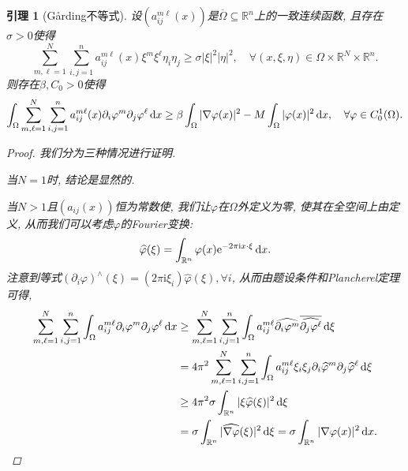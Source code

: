 \documentclass[12pt,a4paper]{article}
\newtheorem{lemma}[theorem]{引理}
\begin{document}
\begin{lemma}[G\r arding不等式]
    设$(a_{ij}^{m\ell}(x))$是$\overline{\Omega} \subseteq \mathbb{R}^n$上的一致连续函数, 且存在$\sigma > 0$使得 
    \begin{equation*}
        \sum_{m, \ell = 1}^N\sum_{i, j = 1}^na_{ij}^{m\ell}(x)\xi^m\xi^\ell\eta_i\eta_j \geq \sigma|\xi|^2|\eta|^2, \quad \forall (x, \xi, \eta) \in \Omega \times \mathbb{R}^N \times \mathbb{R}^n.
    \end{equation*}
    则存在$\beta, C_0 > 0$使得 
    \begin{equation*}
        \int_{\Omega}\sum_{m, \ell = 1}^N\sum_{i, j = 1}^na_{ij}^{m\ell}(x)\partial_i\varphi^m\partial_j\varphi^\ell \,{\rm d}x \geq \beta\int_{\Omega}|\nabla\varphi(x)|^2 - M\int_{\Omega}|\varphi(x)|^2 \,{\rm d}x, \quad \forall \varphi \in C_0^1(\Omega).
    \end{equation*}
    \begin{proof}
        我们分为三种情况进行证明. 

        当$N = 1$时, 结论是显然的.

        当$N > 1$且$(a_{ij}(x))$恒为常数使, 我们让$\varphi$在$\Omega$外定义为零, 使其在全空间上由定义, 从而我们可以考虑$\varphi$的Fourier变换:
        \begin{equation*}
            \widehat{\varphi}(\xi) = \int_{\mathbb{R}^n}\varphi(x)\mathrm{e}^{-2\pi\mathrm{i}x \cdot \xi} \,{\rm d}x. 
        \end{equation*}
        注意到等式$(\partial_i\varphi)^{\wedge}(\xi) = (2\pi\mathrm{i}\xi_i)\widehat{\varphi}(\xi), \forall i$, 从而由题设条件和Plancherel定理可得, 
        \begin{align*}
            \sum_{m, \ell = 1}^N\sum_{i, j = 1}^n\int_{\Omega}a_{ij}^{m\ell}\partial_i\varphi^m\partial_j\varphi^\ell \,{\rm d}x &\geq \sum_{m, \ell = 1}^N\sum_{i, j = 1}^n\int_{\Omega}a_{ij}^{m\ell}\widehat{\partial_i\varphi^m}\overline{\widehat{\partial_j\varphi^\ell}} \,{\rm d}\xi \\ 
            &= 4\pi^2 \sum_{m, \ell = 1}^N\sum_{i, j = 1}^n\int_{\Omega}a_{ij}^{m\ell}\xi_i\xi_j\partial_i\widehat{\varphi}^m\partial_j\widehat{\varphi}^\ell \,{\rm d}\xi \\ 
            &\geq 4\pi^2\sigma\int_{\mathbb{R}^n}|\xi\widehat{\varphi}(\xi)|^2 \,{\rm d}\xi \\  
            &= \sigma\int_{\mathbb{R}^n}|\widehat{\nabla\varphi}(\xi)|^2 \,{\rm d}\xi = \sigma\int_{\mathbb{R}^n}|\nabla\varphi(x)|^2 \,{\rm d}x. 
        \end{align*}


\end{proof}
\end{lemma}
\end{document}
